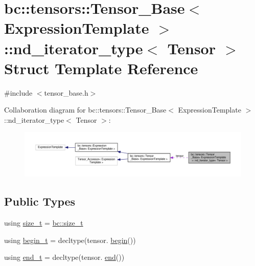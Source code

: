 \hypertarget{structbc_1_1tensors_1_1Tensor__Base_1_1nd__iterator__type}{}\section{bc\+:\+:tensors\+:\+:Tensor\+\_\+\+Base$<$ Expression\+Template $>$\+:\+:nd\+\_\+iterator\+\_\+type$<$ Tensor $>$ Struct Template Reference}
\label{structbc_1_1tensors_1_1Tensor__Base_1_1nd__iterator__type}


{\ttfamily \#include $<$tensor\+\_\+base.\+h$>$}



Collaboration diagram for bc\+:\+:tensors\+:\+:Tensor\+\_\+\+Base$<$ Expression\+Template $>$\+:\+:nd\+\_\+iterator\+\_\+type$<$ Tensor $>$\+:\nopagebreak
\begin{figure}[H]
\begin{center}
\leavevmode
\includegraphics[width=350pt]{structbc_1_1tensors_1_1Tensor__Base_1_1nd__iterator__type__coll__graph}
\end{center}
\end{figure}
\subsection*{Public Types}
\begin{DoxyCompactItemize}
\item 
using \hyperlink{structbc_1_1tensors_1_1Tensor__Base_1_1nd__iterator__type_a61b9b5bad77746684cc457b24b2cc202}{size\+\_\+t} = \hyperlink{namespacebc_aaf8e3fbf99b04b1b57c4f80c6f55d3c5}{bc\+::size\+\_\+t}
\item 
using \hyperlink{structbc_1_1tensors_1_1Tensor__Base_1_1nd__iterator__type_a9b63eaeda87e319d02d937a5ebcb6cdf}{begin\+\_\+t} = decltype(tensor. \hyperlink{structbc_1_1tensors_1_1Tensor__Base_1_1nd__iterator__type_a430ba9b782f52539459544676f369e36}{begin}())
\item 
using \hyperlink{structbc_1_1tensors_1_1Tensor__Base_1_1nd__iterator__type_a3c6a8833df7b94e13446d929cd57e257}{end\+\_\+t} = decltype(tensor. \hyperlink{structbc_1_1tensors_1_1Tensor__Base_1_1nd__iterator__type_aa4eda31e9f2052dc1c555a5cd1e9b2bc}{end}())
\end{DoxyCompactItemize}
